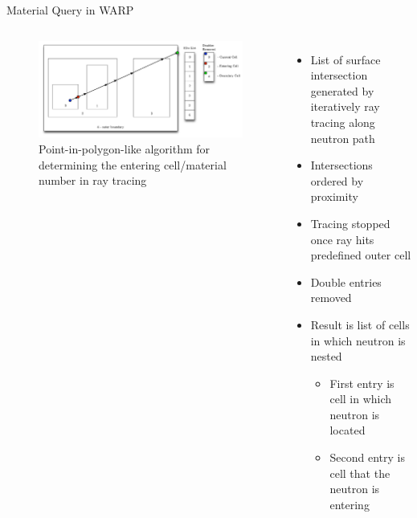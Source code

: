 \documentclass[xcolor=x11names, compress]{beamer}
\renewcommand{\(}{\begin{columns}}
\renewcommand{\)}{\end{columns}}
\newcommand{\<}[1]{\begin{column}{#1}}
\renewcommand{\>}{\end{column}}
\begin{document}
\begin{frame}{Material Query in WARP \cite{warp}}

\begin{columns}
	\begin{figure}[h!]
	\includegraphics[width=2.5 in]{../figs/whereami}
	\caption*{Point-in-polygon-like algorithm for determining the entering cell/material number in ray tracing \label{whereami}}
	\end{figure}
	\begin{itemize}
	\item{List of surface intersection generated by iteratively ray tracing along neutron path}
	\item{Intersections ordered by proximity}
	\item{Tracing stopped once ray hits predefined outer cell}
	\pause
	\item{Double entries removed}
	\pause
	\item{Result is list of cells in which neutron is nested}
		\begin{itemize}
		\item{First entry is cell in which neutron is located}
		\item{Second entry is cell that the neutron is entering}
		\end{itemize}
	\end{itemize}
\end{columns}
\end{frame}
\end{document}
